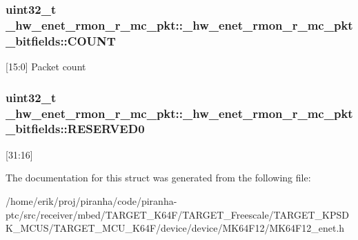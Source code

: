 \subsubsection[{\texorpdfstring{C\+O\+U\+NT}{COUNT}}]{\setlength{\rightskip}{0pt plus 5cm}uint32\+\_\+t \+\_\+hw\+\_\+enet\+\_\+rmon\+\_\+r\+\_\+mc\+\_\+pkt\+::\+\_\+hw\+\_\+enet\+\_\+rmon\+\_\+r\+\_\+mc\+\_\+pkt\+\_\+bitfields\+::\+C\+O\+U\+NT}\hypertarget{struct__hw__enet__rmon__r__mc__pkt_1_1__hw__enet__rmon__r__mc__pkt__bitfields_a593737163ee6c0eb6ae7b74c2b7f8693}{}\label{struct__hw__enet__rmon__r__mc__pkt_1_1__hw__enet__rmon__r__mc__pkt__bitfields_a593737163ee6c0eb6ae7b74c2b7f8693}
\mbox{[}15\+:0\mbox{]} Packet count 
\subsubsection[{\texorpdfstring{R\+E\+S\+E\+R\+V\+E\+D0}{RESERVED0}}]{\setlength{\rightskip}{0pt plus 5cm}uint32\+\_\+t \+\_\+hw\+\_\+enet\+\_\+rmon\+\_\+r\+\_\+mc\+\_\+pkt\+::\+\_\+hw\+\_\+enet\+\_\+rmon\+\_\+r\+\_\+mc\+\_\+pkt\+\_\+bitfields\+::\+R\+E\+S\+E\+R\+V\+E\+D0}\hypertarget{struct__hw__enet__rmon__r__mc__pkt_1_1__hw__enet__rmon__r__mc__pkt__bitfields_a01d4e85ed422d24284ad6dc2133d94bd}{}\label{struct__hw__enet__rmon__r__mc__pkt_1_1__hw__enet__rmon__r__mc__pkt__bitfields_a01d4e85ed422d24284ad6dc2133d94bd}
\mbox{[}31\+:16\mbox{]} 

The documentation for this struct was generated from the following file\+:\begin{DoxyCompactItemize}
\item 
/home/erik/proj/piranha/code/piranha-\/ptc/src/receiver/mbed/\+T\+A\+R\+G\+E\+T\+\_\+\+K64\+F/\+T\+A\+R\+G\+E\+T\+\_\+\+Freescale/\+T\+A\+R\+G\+E\+T\+\_\+\+K\+P\+S\+D\+K\+\_\+\+M\+C\+U\+S/\+T\+A\+R\+G\+E\+T\+\_\+\+M\+C\+U\+\_\+\+K64\+F/device/device/\+M\+K64\+F12/M\+K64\+F12\+\_\+enet.\+h\end{DoxyCompactItemize}
